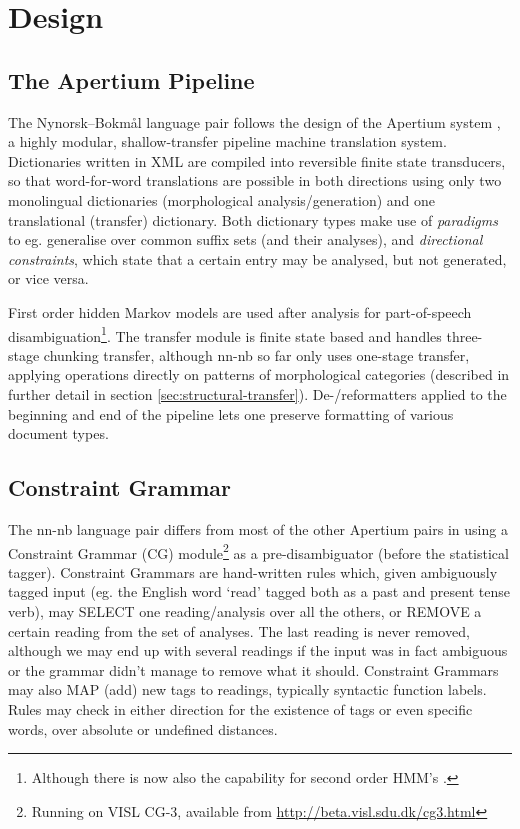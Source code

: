 \documentclass[11pt]{article}
\begin{document}
\section{Design}
 \label{sec:design}
\subsection{The Apertium Pipeline}
 The Nynorsk–Bokmål language pair follows the design of the Apertium
 system
 \citep{corbi05oss}, a highly modular, shallow-transfer pipeline
 machine translation system. Dictionaries written in XML are compiled
 into reversible finite state transducers, so that word-for-word
 translations are possible in both directions using only two
 monolingual dictionaries (morphological analysis/generation) and one
 translational (transfer) dictionary. Both dictionary types make use of
 \emph{paradigms} to eg. generalise over common suffix sets (and
 their analyses), and \emph{directional constraints}, which state that
 a certain entry may be analysed, but not generated, or vice versa.

 First order hidden Markov models are used after analysis for
 part-of-speech disambiguation\footnote{Although there is now also the
   capability for second order HMM's \citep{sheikh2009trigram}. }.
 The transfer module is finite state based and handles
 three-stage chunking transfer, although nn-nb so far only uses
 one-stage
 transfer, applying operations directly on patterns of morphological
 categories (described in further detail in section
 \ref{sec:structural-transfer}).
 De-/reformatters
 applied to the beginning and end of the pipeline lets one preserve
 formatting of various document types.

\subsection{Constraint Grammar}
The nn-nb language pair differs from most of the other Apertium pairs
in using a Constraint Grammar (CG) module\footnote{Running on VISL
  CG-3,
  available from
  \href{http://beta.visl.sdu.dk/cg3.html}{http://beta.visl.sdu.dk/cg3.html}
} as a pre-disambiguator (before the statistical tagger). Constraint
Grammars \citep{karlsson1990cgf} are hand-written rules which, given
ambiguously tagged input (eg. the English word `read' tagged both as a
past and present tense verb), may SELECT one reading/analysis over all
the others, or REMOVE a certain reading from the set of analyses. The
last reading is never removed, although we may end up with several
readings if the input was in fact ambiguous or the grammar didn't
manage to remove what it should. Constraint Grammars may also MAP
(add) new tags to readings, typically syntactic function labels. Rules
may check in either direction for the existence of tags or even
specific words, over absolute or undefined distances. 
\end{document}

